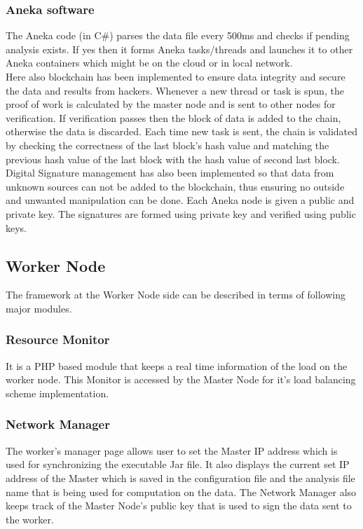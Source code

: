 \documentclass[10pt,journal,compsoc]{IEEEtran}
\begin{document}
\subsubsection{Aneka software}
The Aneka code (in C\#) parses the data file every 500ms and checks if pending analysis exists. If yes then it forms Aneka tasks/threads and launches it to other Aneka containers which might be on the cloud or in local network. \\
Here also blockchain has been implemented to ensure data integrity and secure the data and results from hackers. Whenever a new thread or task is spun, the proof of work is calculated by the master node and is sent to other nodes for verification. If verification passes then the block of data is added to the chain, otherwise the data is discarded. Each time new task is sent, the chain is validated by checking the correctness of the last block’s hash value and matching the previous hash value of the last block with the hash value of second last block. \\
Digital Signature management has also been implemented so that data from unknown sources can not be added to the blockchain, thus ensuring no outside and unwanted manipulation can be done. Each Aneka node is given a public and private key. The signatures are formed using private key and verified using public keys. 

\subsection{Worker Node}
The framework at the Worker Node side can be described in terms of following major modules.

\subsubsection{Resource Monitor}
It is a PHP based module that keeps a real time information of the load on the worker node. This Monitor is accessed by the Master Node for it's load balancing scheme implementation. 

\subsubsection{Network Manager}
The worker’s manager page allows user to set the Master IP address which is used for synchronizing the executable Jar file. It also displays the current set IP address of the Master which is saved in the configuration file and the analysis file name that is being used for computation on the data. The Network Manager also keeps track of the Master Node's public key that is used to sign the data sent to the worker.
\end{document}
